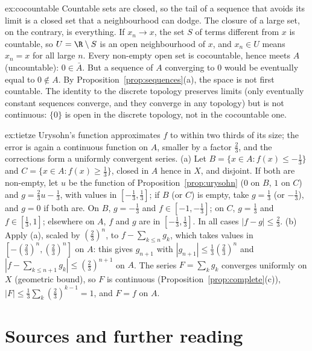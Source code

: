 \begin{solution}{ex:cocountable}
\idea Countable sets are closed, so the tail of a sequence that avoids its limit is a closed set that a neighbourhood can dodge. The
closure of a large set, on the contrary, is everything.
\writeup If $x_n\to x$, the set $S$ of terms different from $x$ is countable, so $U=\R\setminus S$ is an open neighbourhood of $x$, and $x_n\in U$ means $x_n=x$ for all large $n$.
Every non-empty open set is cocountable, hence meets $A$ (uncountable): $0\in\bar A$. But a sequence of $A$ converging to $0$ would be eventually
equal to $0\notin A$. By Proposition~\ref{prop:sequences}(a), the space is not first countable. The identity to the discrete topology preserves limits
(only eventually constant sequences converge, and they converge in any topology) but is not continuous: $\{0\}$ is open in the
discrete topology, not in the cocountable one.
\end{solution}

\begin{solution}{ex:tietze}
\idea Urysohn's function approximates $f$ to within two thirds of its size; the error is again a continuous function on $A$, smaller by a
factor $\frac23$, and the corrections form a uniformly convergent series.
\writeup (a) Let $B=\{x\in A:f(x)\le-\frac13\}$ and $C=\{x\in A:f(x)\ge\frac13\}$, closed in $A$ hence in $X$, and disjoint. If both are non-empty, let $u$ be the function of
Proposition~\ref{prop:urysohn} ($0$ on $B$, $1$ on $C$) and $g=\frac23u-\frac13$, with values in $[-\frac13,\frac13]$; if $B$ (or $C$) is empty, take $g=\frac13$ (or $-\frac13$), and $g=0$ if
both are. On $B$, $g=-\frac13$ and $f\in[-1,-\frac13]$; on $C$, $g=\frac13$ and $f\in[\frac13,1]$; elsewhere on $A$, $f$ and $g$ are in $[-\frac13,\frac13]$. In all cases
$|f-g|\le\frac23$. (b) Apply (a), scaled by $(\frac23)^n$, to $f-\sum_{k\le n}g_k$, which takes values in $[-(\frac23)^n,(\frac23)^n]$ on $A$: this gives $g_{n+1}$ with
$|g_{n+1}|\le\frac13(\frac23)^n$ and $|f-\sum_{k\le n+1}g_k|\le(\frac23)^{n+1}$ on $A$. The series $F=\sum_kg_k$ converges uniformly on $X$ (geometric bound), so $F$ is continuous
(Proposition~\ref{prop:complete}(c)), $|F|\le\frac13\sum_k(\frac23)^{k-1}=1$, and $F=f$ on $A$.
\end{solution}

\section*{Sources and further reading}

